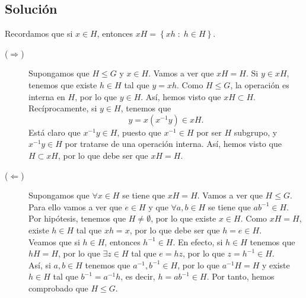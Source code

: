 \documentclass{article}
\begin{document}
\subsection*{Solución}
	Recordamos que si $\displaystyle x \in H $, entonces $\displaystyle xH = \left\{ xh \; : \; h \in H\right\}  $.
	\begin{description}
	\item[($\displaystyle \Rightarrow $)] Supongamos que $\displaystyle H \leq G $ y $\displaystyle x \in H $. Vamos a ver que $\displaystyle xH = H $. Si $\displaystyle y \in xH $, tenemos que existe $\displaystyle h \in H $ tal que $\displaystyle y = xh $. Como $\displaystyle H \leq G $, la operación es interna en $\displaystyle H $, por lo que $\displaystyle y \in H $. Así, hemos visto que $\displaystyle xH \subset H $. Recíprocamente, si $\displaystyle y \in H $, tenemos que 
		\[y = x\left(x^{-1}y\right) \in xH .\]
		Está claro que $\displaystyle x^{-1}y \in H $, puesto que $\displaystyle x^{-1} \in H $ por ser $\displaystyle H $ subgrupo, y $\displaystyle x^{-1}y \in H $ por tratarse de una operación interna. Así, hemos visto que $\displaystyle H \subset xH $, por lo que debe ser que $\displaystyle xH = H $.
	\item[($\displaystyle \Leftarrow $)] Supongamos que $\displaystyle \forall x \in H $ se tiene que $\displaystyle xH = H $. Vamos a ver que $\displaystyle H \leq G $. Para ello vamos a ver que $\displaystyle e \in H $ y que $\displaystyle \forall a,b \in H $ se tiene que $\displaystyle ab^{-1} \in H $. \\
		Por hipótesis, tenemos que $\displaystyle H \neq \emptyset $, por lo que existe $\displaystyle x \in H $. Como $\displaystyle xH = H $, existe $\displaystyle h \in H $ tal que $\displaystyle xh = x $, por lo que debe ser que $\displaystyle h = e \in H $. \\
		Veamos que si $\displaystyle h \in H $, entonces $\displaystyle h^{-1} \in H $. En efecto, si $\displaystyle h \in H $ tenemos que $\displaystyle hH = H $, por lo que $\displaystyle \exists z \in H $ tal que $\displaystyle e = hz $, por lo que $\displaystyle z = h^{-1} \in H $. \\
		Así, si $\displaystyle a,b \in H $ tenemos que $\displaystyle a^{-1}, b^{-1} \in H $, por lo que $\displaystyle a^{-1}H = H $ y existe $\displaystyle h \in H $ tal que $\displaystyle b^{-1} = a^{-1}h $, es decir, $\displaystyle h = ab^{-1} \in H $. Por tanto, hemos comprobado que $\displaystyle H \leq G $.
	\end{description}
\end{document}
